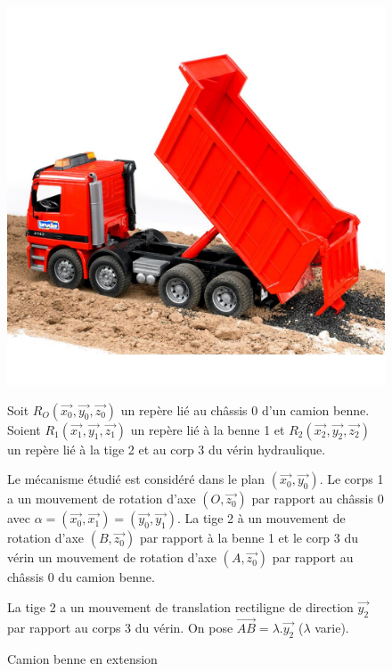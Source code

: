 \begin{figure}[htbp]
\begin{minipage}[c]{.48\linewidth}
\begin{center}
\includegraphics[width=\linewidth]{img/camion-benne.jpg}
\caption{Camion benne en extension}
\label{fig:image3}
\end{center}
\end{minipage}
\hfill
\begin{minipage}[c]{.48\linewidth}
Soit $R_O(\overrightarrow{x_0},\overrightarrow{y_0},\overrightarrow{z_0})$ un repère lié au châssis 0 d'un camion benne.
Soient $R_1(\overrightarrow{x_1},\overrightarrow{y_1},\overrightarrow{z_1})$ un repère lié à la benne 1 et $R_2(\overrightarrow{x_2},\overrightarrow{y_2},\overrightarrow{z_2})$ un repère lié à la tige 2
et au corp 3 du vérin hydraulique.

Le mécanisme étudié est considéré dans le plan $(\overrightarrow{x_0},\overrightarrow{y_0})$. Le corps 1 a un mouvement de rotation d'axe $(O, \overrightarrow{z_0})$ par rapport au châssis 0 avec $\alpha=(\overrightarrow{x_0},\overrightarrow{x_1})=(\overrightarrow{y_0},\overrightarrow{y_1})$. La tige 2 à un mouvement de rotation d'axe $(B, \overrightarrow{z_0})$ par rapport à la benne 1 et le corp 3 du vérin un mouvement de rotation d'axe $(A, \overrightarrow{z_0})$ par rapport au châssis 0 du camion benne.

La tige 2 a un mouvement de translation rectiligne de direction $\overrightarrow{y_2}$ par rapport au corps 3 du vérin. On pose $\overrightarrow{AB}=\lambda.\overrightarrow{y_2}$ ($\lambda$ varie).
\end{minipage}
\end{figure}

